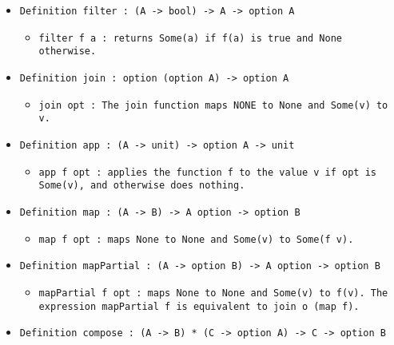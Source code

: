 \documentclass[11pt]{report}
\begin{document}
\begin{itemize}
\item  \texttt{Definition filter : (A -> bool) -> A -> option A}

\begin{itemize}
\item  \texttt{filter f a : returns Some(a) if f(a) is true and None otherwise.}
\end{itemize}

\item  \texttt{Definition join : option (option A) -> option A}

\begin{itemize}
\item  \texttt{join opt : The join function maps NONE to None and Some(v) to v.}
\end{itemize}

\item  \texttt{Definition app : (A -> unit) -> option A -> unit}

\begin{itemize}
\item  \begin{flushleft} \texttt{app f opt : applies the function f to the value v if opt is Some(v), and otherwise does nothing. } \end{flushleft}
\end{itemize}

\item  \texttt{Definition map : (A -> B) -> A option -> option B}

\begin{itemize}
\item  \texttt{map f opt : maps None to None and Some(v) to Some(f v).}
\end{itemize}

\item  \texttt{Definition mapPartial : (A -> option B) -> A option -> option B}

\begin{itemize}
\item  \begin{flushleft} \texttt{mapPartial f opt : maps None to None and Some(v) to f(v). The expression mapPartial f is equivalent to join o (map f).} \end{flushleft}



\end{itemize}

\item  \texttt{Definition compose : (A -> B) * (C -> option A) -> C -> option B}


\end{itemize}
\end{document}
